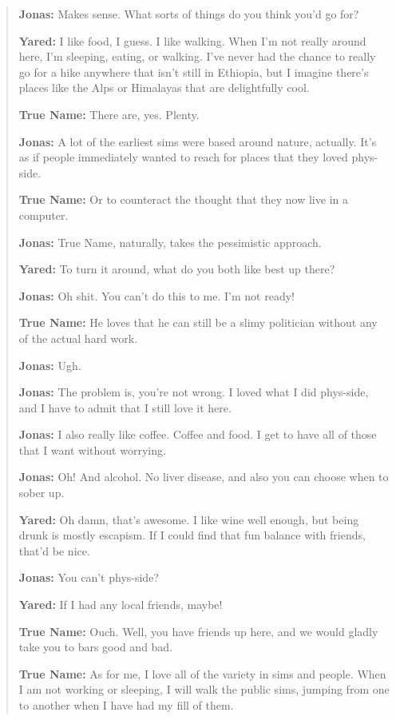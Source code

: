 \begin{quote}
\textbf{Jonas:} Makes sense. What sorts of things do you think you'd go for?

\textbf{Yared:} I like food, I guess. I like walking. When I'm not really around here, I'm sleeping, eating, or walking. I've never had the chance to really go for a hike anywhere that isn't still in Ethiopia, but I imagine there's places like the Alps or Himalayas that are delightfully cool.

\textbf{True Name:} There are, yes. Plenty.

\textbf{Jonas:} A lot of the earliest sims were based around nature, actually. It's as if people immediately wanted to reach for places that they loved phys-side.

\textbf{True Name:} Or to counteract the thought that they now live in a computer.

\textbf{Jonas:} True Name, naturally, takes the pessimistic approach.

\textbf{Yared:} To turn it around, what do you both like best up there?

\textbf{Jonas:} Oh shit. You can't do this to me. I'm not ready!

\textbf{True Name:} He loves that he can still be a slimy politician without any of the actual hard work.

\textbf{Jonas:} Ugh.

\textbf{Jonas:} The problem is, you're not wrong. I loved what I did phys-side, and I have to admit that I still love it here.

\textbf{Jonas:} I also really like coffee. Coffee and food. I get to have all of those that I want without worrying.

\textbf{Jonas:} Oh! And alcohol. No liver disease, and also you can choose when to sober up.

\textbf{Yared:} Oh damn, that's awesome. I like wine well enough, but being drunk is mostly escapism. If I could find that fun balance with friends, that'd be nice.

\textbf{Jonas:} You can't phys-side?

\textbf{Yared:} If I had any local friends, maybe!

\textbf{True Name:} Ouch. Well, you have friends up here, and we would gladly take you to bars good and bad.

\textbf{True Name:} As for me, I love all of the variety in sims and people. When I am not working or sleeping, I will walk the public sims, jumping from one to another when I have had my fill of them.


\end{quote}
